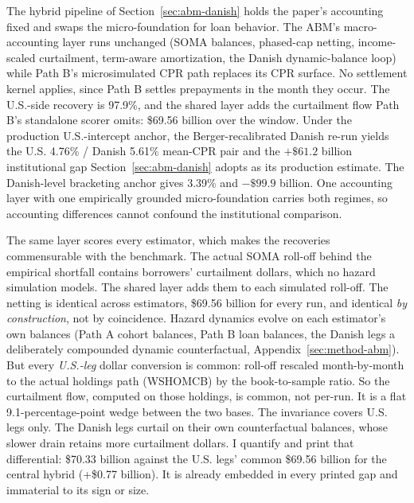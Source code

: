 \documentclass[12pt]{article}
\begin{document}
The hybrid pipeline of Section~\ref{sec:abm-danish} holds the paper's accounting fixed and swaps the micro-foundation for loan behavior. The ABM's macro-accounting layer runs unchanged (SOMA balances, phased-cap netting, income-scaled curtailment, term-aware amortization, the Danish dynamic-balance loop) while Path B's microsimulated CPR path replaces its CPR surface. No settlement kernel applies, since Path B settles prepayments in the month they occur. The U.S.-side recovery is 97.9\%, and the shared layer adds the curtailment flow Path B's standalone scorer omits: \$69.56 billion over the window. Under the production U.S.-intercept anchor, the Berger-recalibrated Danish re-run yields the U.S. 4.76\% / Danish 5.61\% mean-CPR pair and the $+\$61.2$ billion institutional gap Section~\ref{sec:abm-danish} adopts as its production estimate. The Danish-level bracketing anchor gives 3.39\% and $-\$99.9$ billion. One accounting layer with one empirically grounded micro-foundation carries both regimes, so accounting differences cannot confound the institutional comparison.

The same layer scores every estimator, which makes the recoveries commensurable with the benchmark. The actual SOMA roll-off behind the empirical shortfall contains borrowers' curtailment dollars, which no hazard simulation models. The shared layer adds them to each simulated roll-off. The netting is identical across estimators, \$69.56 billion for every run, and identical \emph{by construction}, not by coincidence. Hazard dynamics evolve on each estimator's own balances (Path A cohort balances, Path B loan balances, the Danish legs a deliberately compounded dynamic counterfactual, Appendix~\ref{sec:method-abm}). But every \emph{U.S.-leg} dollar conversion is common: roll-off rescaled month-by-month to the actual holdings path (WSHOMCB) by the book-to-sample ratio. So the curtailment flow, computed on those holdings, is common, not per-run. It is a flat 9.1-percentage-point wedge between the two bases. The invariance covers U.S. legs only. The Danish legs curtail on their own counterfactual balances, whose slower drain retains more curtailment dollars. I quantify and print that differential: \$70.33 billion against the U.S. legs' common \$69.56 billion for the central hybrid (+\$0.77 billion). It is already embedded in every printed gap and immaterial to its sign or size.
\end{document}
